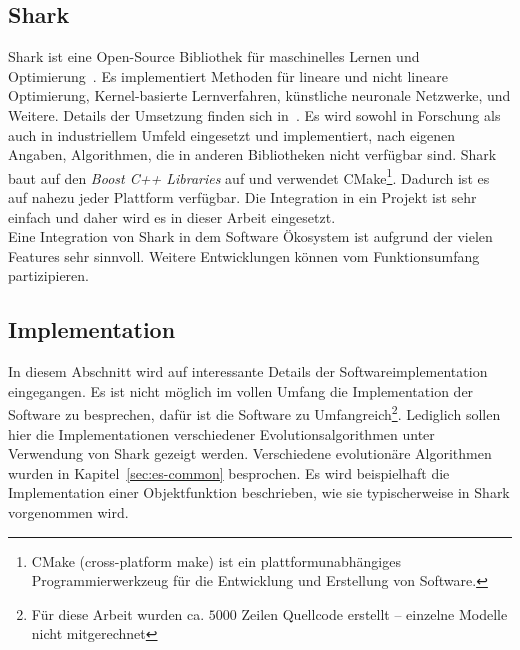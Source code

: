 %
\lstset{
	basicstyle=\scriptsize,
	language=C++,
	breaklines=true,
	frame=tbrl,
	breakatwhitespace=false
	breaklines=true,  
	xleftmargin=1cm,
	tabsize=2,
	showstringspaces=false}
%
\subsection{Shark}
\label{sec:Shark}
Shark ist eine Open-Source \cpp Bibliothek für maschinelles Lernen und Optimierung~\cite{Shark:1}. Es implementiert Methoden für lineare und nicht lineare Optimierung, Kernel-basierte Lernverfahren, künstliche neuronale Netzwerke, und Weitere. Details der Umsetzung finden sich in~\cite{shark08}. Es wird sowohl in Forschung als auch in industriellem Umfeld eingesetzt und implementiert, nach eigenen Angaben, Algorithmen, die in anderen Bibliotheken nicht verfügbar sind. Shark baut auf den \textit{Boost C++ Libraries} auf und verwendet CMake\footnote{CMake (cross-platform make) ist ein plattformunabhängiges Programmierwerkzeug für die Entwicklung und Erstellung von Software.}. Dadurch ist es auf nahezu jeder Plattform verfügbar. Die Integration in ein Projekt ist sehr einfach und daher wird es in dieser Arbeit eingesetzt.\\

Eine Integration von Shark in dem Software Ökosystem ist aufgrund der vielen Features sehr sinnvoll. Weitere Entwicklungen können vom Funktionsumfang partizipieren.

%
\subsection{Implementation}
\label{sec:Implementation}
In diesem Abschnitt wird auf interessante Details der Softwareimplementation eingegangen. Es ist nicht möglich im vollen Umfang die Implementation der Software zu besprechen, dafür ist die Software zu Umfangreich\footnote{Für diese Arbeit wurden ca. $5000$ Zeilen Quellcode erstellt -- einzelne Modelle nicht mitgerechnet}. Lediglich sollen hier die Implementationen verschiedener Evolutionsalgorithmen unter Verwendung von Shark gezeigt werden. Verschiedene evolutionäre Algorithmen wurden in Kapitel~\ref{sec:es-common} besprochen.%
\lipsum[1]
Es wird beispielhaft die Implementation einer Objektfunktion beschrieben, wie sie typischerweise in Shark vorgenommen wird.
%
%
%
